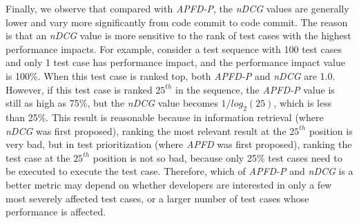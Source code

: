 Finally, we observe that compared with \textit{APFD-P}, the \textit{nDCG} values are generally lower and vary more significantly from code commit to code commit. The reason is that an \textit{nDCG} value is more sensitive to the rank of test cases with the highest performance impacts. For example, consider a test sequence with 100 test cases and only 1 test case has performance impact, and the performance impact value is 100\%. When this test case is ranked top, both \textit{APFD-P} and \textit{nDCG} are 1.0. However, if this test case is ranked $25^{th}$ in the sequence, the \textit{APFD-P} value is still as high as 75\%, but the \textit{nDCG} value becomes $1/log_2(25)$, which is less than 25\%. This result is reasonable because in information retrieval (where \textit{nDCG} was first  proposed), ranking the most relevant result at the $25^{th}$ position is very bad, but in test prioritization (where \textit{APFD} was first proposed), ranking the test case at the $25^{th}$ position is not so bad, because only 25\% test cases need to be executed to execute the test case. Therefore, which of \textit{APFD-P} and \textit{nDCG} is a better metric may depend on whether developers are interested in only a few most severely affected test cases, or a larger number of test cases whose performance is affected. 






 



